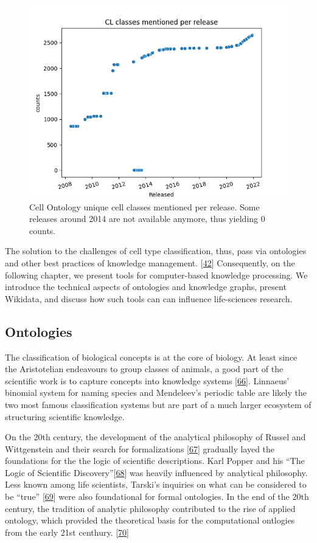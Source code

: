 \begin{figure}
\hypertarget{fig:cl_counts}{%
\centering
\includegraphics[width=0.85\columnwidth]{images/classes_per_release.png}
\caption{Cell Ontology unique cell classes mentioned per release. Some releases around 2014 are not available anymore, thus yielding 0 counts.}\label{fig:cl_counts}
}
\end{figure}

The solution to the challenges of cell type classification, thus, pass via ontologies and other best practices of knowledge management. {[}\protect\hyperlink{ref-qT8WxqjA}{42}{]}
Consequently, on the following chapter, we present tools for computer-based knowledge processing.
We introduce the technical aspects of ontologies and knowledge graphs, present Wikidata, and discuss how such tools can can influence life-sciences research.

\hypertarget{ontologies}{%
\subsection{Ontologies}\label{ontologies}}

The classification of biological concepts is at the core of biology. At least since the Aristotelian endeavours to group classes of animals, a good part of the scientific work is to capture concepts into knowledge systems {[}\protect\hyperlink{ref-DLTMbf54}{66}{]}.
Linnaeus' binomial system for naming species and Mendeleev's periodic table are likely the two most famous classification systems but are part of a much larger ecosystem of structuring scientific knowledge.

On the 20th century, the development of the analytical philosophy of Russel and Wittgenstein and their search for formalizations {[}\protect\hyperlink{ref-cZEmYsqx}{67}{]} gradually layed the foundations for the the logic of scientific descriptions.
Karl Popper and his ``The Logic of Scientific Discovery''{[}\protect\hyperlink{ref-to2onCDy}{68}{]} was heavily influenced by analytical philosophy.
Less known among life scientists, Tarski's inquiries on what can be considered to be ``true'' {[}\protect\hyperlink{ref-RghcuiSS}{69}{]} were also foundational for formal ontologies.
In the end of the 20th century, the tradition of analytic philosophy contributed to the rise of applied ontology, which provided the theoretical basis for the computational ontlogies from the early 21st centhury. {[}\protect\hyperlink{ref-35incsRu}{70}{]}


